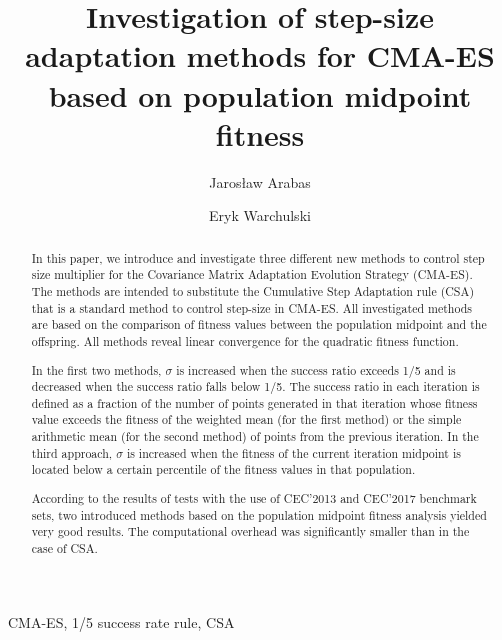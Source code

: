 \documentclass[runningheads,a4paper]{llncs}
\newcommand{\keywords}[1]{\par\addvspace\baselineskip
\noindent\keywordname\enspace\ignorespaces#1}
\begin{document}
\mainmatter  
\title{Investigation of step-size adaptation methods for CMA-ES based on population midpoint fitness}


\author{Jaros\l aw Arabas\and Eryk Warchulski}
%



\maketitle


\begin{abstract}

In this paper, we introduce and investigate three different new methods to control step size multiplier for the Covariance Matrix Adaptation Evolution Strategy (CMA-ES). The methods are intended to substitute the Cumulative Step Adaptation rule (CSA) that is a standard method to control step-size in CMA-ES. All investigated methods are based on the comparison of fitness values between the population midpoint and the offspring. All methods reveal linear convergence for the quadratic fitness function. 

In the first two methods, $\sigma$ is increased when the success ratio exceeds 1/5 and is decreased when the success ratio falls below 1/5. The success ratio in each iteration is defined as a fraction of the number of points generated in that iteration whose fitness value exceeds the fitness of the weighted mean (for the first method) or the simple arithmetic mean (for the second method) of points from the previous iteration.  In the third approach, $\sigma$ is increased when the fitness of the current iteration midpoint is located below a certain percentile of the fitness values in that population.

According to the results of tests with the use of  CEC'2013 and CEC'2017 benchmark sets, two introduced methods based on the population midpoint fitness analysis yielded very good results. The computational overhead was significantly smaller than in the case of CSA.

\end{abstract}
\keywords{CMA-ES, 1/5 success rate rule, CSA}
\end{document}
